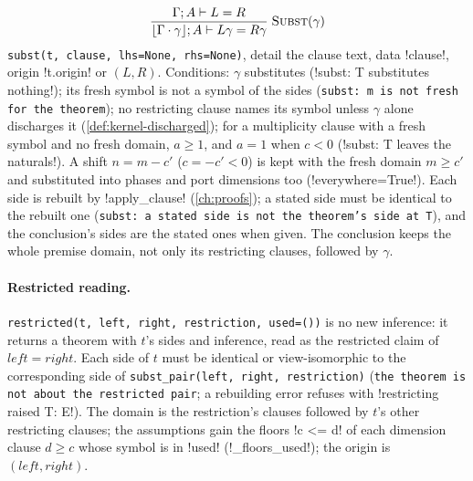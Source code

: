 \[
\frac{\Gamma;A\vdash L=R}{\lfloor\Gamma\cdot\gamma\rfloor;A\vdash L\gamma=R\gamma}\;\textsc{Subst}(\gamma)
\]
\texttt{subst(\allowbreak{}t,\allowbreak{} clause,\allowbreak{} lhs=None,\allowbreak{} rhs=None)}, detail the clause text, data \code!clause!, origin \code!t.origin! or $(L,R)$. Conditions: $\gamma$ substitutes (\code!subst: T substitutes nothing!); its fresh symbol is not a symbol of the sides (\texttt{subst: m is not fresh for the theorem}); no restricting clause names its symbol unless $\gamma$ alone discharges it (\cref{def:kernel-discharged}); for a multiplicity clause with a fresh symbol and no fresh domain, $a\ge1$, and $a=1$ when $c<0$ (\code!subst: T leaves the naturals!). A shift $n=m-c'$ ($c=-c'<0$) is kept with the fresh domain $m\ge c'$ and substituted into phases and port dimensions too (\code!everywhere=True!). Each side is rebuilt by \py!apply_clause! (\cref{ch:proofs}); a stated side must be identical to the rebuilt one (\texttt{subst: a stated side is not the theorem's side at T}), and the conclusion's sides are the stated ones when given. The conclusion keeps the whole premise domain, not only its restricting clauses, followed by $\gamma$.

\paragraph{Restricted reading.} \texttt{restricted(\allowbreak{}t,\allowbreak{} left,\allowbreak{} right,\allowbreak{} restriction,\allowbreak{} used=(\allowbreak{}))} is no new inference: it returns a theorem with $t$'s sides and inference, read as the restricted claim of $\mathit{left}=\mathit{right}$. Each side of $t$ must be identical or view-isomorphic to the corresponding side of \texttt{subst\_\allowbreak{}pair(\allowbreak{}left,\allowbreak{} right,\allowbreak{} restriction)} (\texttt{the theorem is not about the restricted pair}; a rebuilding error refuses with \code!restricting raised T: E!). The domain is the restriction's clauses followed by $t$'s other restricting clauses; the assumptions gain the floors \code!c <= d! of each dimension clause $d\ge c$ whose symbol is in \code!used! (\py!_floors_used!); the origin is $(\mathit{left},\mathit{right})$.

